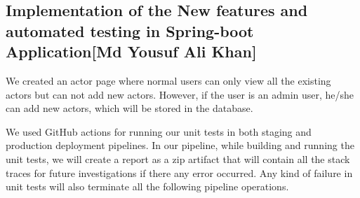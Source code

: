 \subsection{Implementation of the New features and automated testing in Spring-boot Application[Md Yousuf Ali Khan] }\label{sec:feture-imp-spring-boot}

We created an actor page where normal users can only view all the existing actors but can not add new actors. However, if the user is an admin user, he/she can add new actors, which will be stored in the database. 

We used GitHub actions for running our unit tests in both staging and production deployment pipelines. In our pipeline, while building and running the unit tests, we will create a report as a zip artifact that will contain all the stack traces for future investigations if there any error occurred. Any kind of failure in unit tests will also terminate all the following pipeline operations. 

